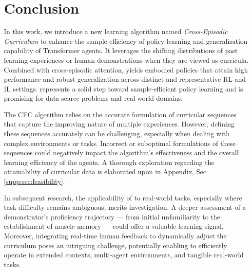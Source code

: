 \section{Conclusion}
\label{sec:conclusion}
In this work, we introduce a new learning algorithm named \emph{Cross-Episodic Curriculum} to enhance the sample efficiency of policy learning and generalization capability of Transformer agents.
It leverages the shifting distributions of past learning experiences or human demonstrations when they are viewed as curricula.
Combined with cross-episodic attention, \cec yields embodied policies that attain high performance and robust generalization across distinct and representative RL and IL settings.
\cec represents a solid step toward sample-efficient policy learning and is promising for data-scarce problems and real-world domains.



The CEC algorithm relies on the accurate formulation of curricular sequences that capture the improving nature of multiple experiences. However, defining these sequences accurately can be challenging, especially when dealing with complex environments or tasks. Incorrect or suboptimal formulations of these sequences could negatively impact the algorithm's effectiveness and the overall learning efficiency of the agents.
A thorough exploration regarding the attainability of curricular data is elaborated upon in Appendix, Sec \ref{supp:sec:feasibility}.

In subsequent research, the applicability of \cec to real-world tasks, especially where task difficulty remains ambiguous, merits investigation. A deeper assessment of a demonstrator's proficiency trajectory --- from initial unfamiliarity to the establishment of muscle memory --- could offer a valuable learning signal. Moreover, integrating real-time human feedback to dynamically adjust the curriculum poses an intriguing challenge, potentially enabling \cec to efficiently operate in extended contexts, multi-agent environments, and tangible real-world tasks.